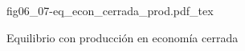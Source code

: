 \begin{figure}[h]
\centering
\def\svgwidth{0.5\textwidth}
{fig06_07-eq_econ_cerrada_prod.pdf_tex}
\caption{Equilibrio con producción en economía cerrada}
\label{fig06_07-eq_econ_cerrada_prod}
\end{figure}